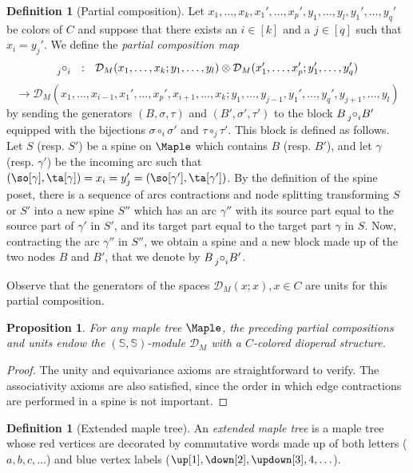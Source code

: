 \documentclass{amsart}
\newtheorem{proposition}[theorem]{Proposition}
\theoremstyle{definition}
\newtheorem{definition}[theorem]{Definition}
\newcommand{\guillaume}[1]{\todo[color=orange!30]{#1 --- G.}}
\begin{document}
\begin{definition}[Partial composition]
Let $x_1,\ldots,x_k,x_1',\ldots,x_p',y_1,\ldots,y_l,y_1',\ldots,y_q'$ be colors of $C$ and suppose that there exists an $i \in [k]$ and a $j \in [q]$ such that $x_i=y_j'$. 
We define the \emph{partial composition map}
\[\prescript{}{j}{\circ}^{}_i \ \  : \ \  
\mathcal{D}_M(x_1,\ldots,x_k;y_1,\ldots,y_l) \otimes \mathcal{D}_M(x_1',\ldots,x_p';y_1',\ldots,y_q') \]
\[\longrightarrow \mathcal{D}_M(x_1,\ldots,x_{i-1},x_1',\ldots,x_p',x_{i+1},\ldots,x_k;y_1,\ldots,y_{j-1},y_1',\ldots,y_q',y_{j+1},\ldots,y_l)\]
by sending the generators $(B,\sigma, \tau)$ and $(B',\sigma',\tau')$ to the block $B \prescript{}{j}{\circ}^{}_i B'$ equipped with the bijections $\sigma \circ_i \sigma'$ and $\tau \circ_j \tau'$.
This block is defined as follows.  
Let $S$ (resp. $S'$) be a spine on $\Maple$ which contains $B$ (resp. $B'$), and let $\gamma$ (resp. $\gamma'$) be the incoming arc such that $(\so[\gamma],\ta[\gamma])=x_i=y_j'=(\so[\gamma'],\ta[\gamma'])$. 
By the definition of the spine poset, there is a sequence of arcs contractions and node splitting transforming $S$ or $S'$ into a new spine $S''$ which has an arc $\gamma''$ with its source part equal to the source part of $\gamma'$ in $S'$, and its target part equal to the target part $\gamma$ in $S$. 
Now, contracting the arc $\gamma''$ in $S''$, we obtain a spine and a new block made up of the two nodes $B$ and $B'$, that we denote by $B \prescript{}{j}{\circ}^{}_i B'$.
\guillaume{well-defined?}
\end{definition}

Observe that the generators of the spaces $\mathcal{D}_M(x;x), x \in C$ are units for this partial composition.

\begin{proposition} 
\label{prop:dioperadstructure}
  For any maple tree $\Maple$, the preceding partial compositions and units endow the $(\mathbb{S},\mathbb{S})$-module $\mathcal{D}_M$ with a $C$-colored dioperad structure.
\end{proposition}

\begin{proof}
The unity and equivariance axioms are straightforward to verify. 
The associativity axioms are also satisfied, since the order in which edge contractions are performed in a spine is not important.
\guillaume{plus de d\'etails?}
\end{proof}

\begin{definition}[Extended maple tree]
  An \emph{extended maple tree} is a maple tree whose red vertices are decorated by commutative words made up of both letters ($a,b,c,\ldots$) and blue vertex labels ($\up[1],\down[2],\updown[3],4,\ldots$). 
\end{definition}
\end{document}
